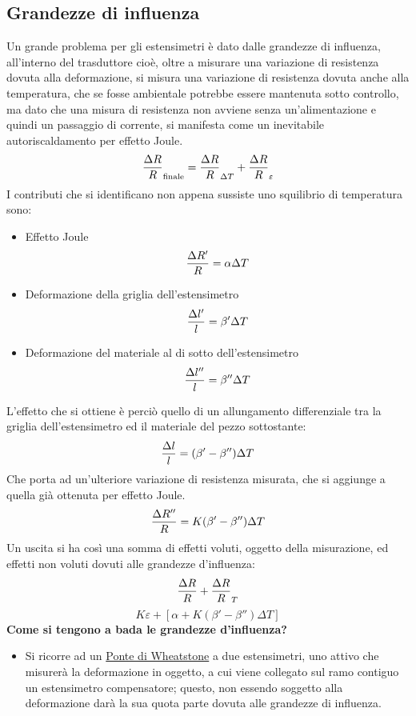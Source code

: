 \documentclass[a4paper, 15pt]{article}
\begin{document}
\subsection{Grandezze di influenza}		
\begin{adjustwidth}{2in}{}
		Un grande problema per gli estensimetri è dato dalle grandezze di influenza, all'interno del trasduttore cioè, oltre a misurare una variazione di resistenza dovuta alla deformazione, si misura una variazione di resistenza dovuta anche alla temperatura, che se fosse ambientale potrebbe essere mantenuta sotto controllo, ma dato che una misura di resistenza non avviene senza un'alimentazione e quindi un passaggio di corrente, si manifesta come un inevitabile autoriscaldamento per effetto Joule.  
		\[{\Delta R\over R}_{\text{finale}} = {\Delta R\over R}_{\Delta T} + {\Delta R\over R}_{\varepsilon}\]
		I contributi che si identificano non appena sussiste uno squilibrio di temperatura sono:
		\begin{itemize}
			\item Effetto Joule 
			\[{\Delta R'\over R}=\alpha\Delta T\]
			\item Deformazione della griglia dell'estensimetro
			\[{\Delta l'\over l} = \beta'\Delta T\]
			\item Deformazione del materiale al di sotto dell'estensimetro
			\[{\Delta l''\over l} = \beta''\Delta T\]
		\end{itemize}
		L'effetto che si ottiene è perciò quello di un allungamento differenziale tra la griglia dell'estensimetro ed il materiale del pezzo sottostante:
		\[{\Delta l\over l} = (\beta'- \beta'')\Delta T\]
		Che porta ad un'ulteriore variazione di resistenza misurata, che si aggiunge a quella già ottenuta per effetto Joule. 
		\[{\Delta R''\over R}=K(\beta'- \beta'')\Delta T\]
		Un uscita si ha così una somma di effetti voluti, oggetto della misurazione, ed effetti non voluti dovuti alle grandezze d'influenza:
		\[{\Delta R\over R} + {\Delta R\over R}_T\]
		\[K\varepsilon + \left[\alpha + K(\beta'- \beta'')\Delta T\right]\]
		 \textbf{Come si tengono a bada le grandezze d'influenza?}
		 \begin{itemize}
		 	\item Si ricorre ad un \underline{Ponte di Wheatstone} a due estensimetri, uno attivo che misurerà la deformazione in oggetto, a cui viene collegato sul ramo contiguo un estensimetro compensatore; questo, non essendo soggetto alla deformazione darà la sua quota parte dovuta alle grandezze di influenza.
\begin{figure}[H]

\end{figure}
\end{itemize}
\end{adjustwidth}
\end{document}
